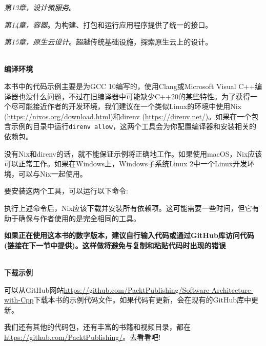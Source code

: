 \textit{第13章，设计微服务}。

\textit{第14章，容器}。为构建、打包和运行应用程序提供了统一的接口。

\textit{第15章，原生云设计}。超越传统基础设施，探索原生云上的设计。

\hspace*{\fill} \\ %
\textbf{编译环境}

本书中的代码示例主要是为GCC 10编写的，使用Clang或Microsoft Visual C++编译器也没什么问题，不过在旧编译器中可能缺少C++20的某些特性。为了获得一个尽可能接近作者的开发环境，我们建议在一个类似Linux的环境中使用Nix (\url{https://nixos.org/download.html})和direnv (\url{https://direnv.net/})。如果在一个包含示例的目录中运行\texttt{direnv allow}，这两个工具会为你配置编译器和安装相关的依赖包。

没有Nix和direnv的话，就不能保证示例将正确地工作。如果使用macOS，Nix应该可以正常工作。如果在Windows上，Windows子系统Linux 2中一个Linux开发环境，可以与Nix一起使用。

要安装这两个工具，可以运行以下命令:


执行上述命令后，Nix应该下载并安装所有依赖项。这可能需要一些时间，但它有助于确保与作者使用的是完全相同的工具。

\textbf{如果正在使用这本书的数字版本，建议自行输入代码或通过GitHub库访问代码(链接在下一节中提供)。这样做将避免与复制和粘贴代码时出现的错误}

\hspace*{\fill} \\ %
\textbf{下载示例}

可以从GitHub网站\url{https://github.com/PacktPublishing/Software-Architecture-with-Cpp}下载本书的示例代码文件。如果代码有更新，会在现有的GitHub库中更新。

我们还有其他的代码包，还有丰富的书籍和视频目录，都在\url{https://github.com/PacktPublishing/}。去看看吧!

